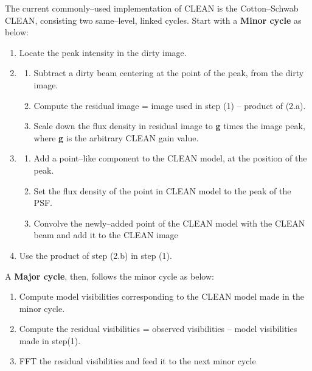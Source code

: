 \documentclass[paper=a4, fontsize=11pt]{scrartcl} %
\numberwithin{equation}{section} %
\numberwithin{figure}{section} %
\numberwithin{table}{section} %
\begin{document}


The current commonly--used implementation of CLEAN is the Cotton--Schwab CLEAN, consisting two same--level, linked cycles.
Start with a {\bf Minor cycle} as below:
\begin{enumerate}
\item Locate the peak intensity in the dirty image.
\item\begin{enumerate}
    \item Subtract a dirty beam centering at the point of the peak, from the dirty image.
    \item Compute the residual image = image used in step (1) -- product of (2.a).
    \item Scale down the flux density in residual image to {\bf g} times the image peak, where {\bf g} is the arbitrary CLEAN gain value.
    \end{enumerate}
\item\begin{enumerate}
    \item Add a point--like component to the CLEAN model, at the position of the peak.
    \item Set the flux density of the point in CLEAN model to the peak of the PSF.
    \item Convolve the newly--added point of the CLEAN model with the CLEAN beam and add it to the CLEAN image
    \end{enumerate}
\item Use the product of step (2.b) in step (1). 
\end{enumerate}
A {\bf Major cycle}, then, follows the minor cycle as below:
\begin{enumerate}
\item Compute model visibilities corresponding to the CLEAN model made in the minor cycle.
\item Compute the residual visibilities = observed visibilities -- model visibilities made in step(1).
\item FFT the residual visibilities and feed it to the next minor cycle 
\end{enumerate}
\end{document}
